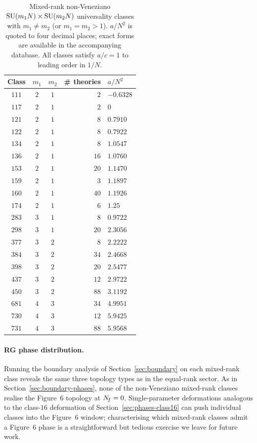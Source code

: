 \begin{table}[h]
  \centering
  \small
  \begin{tabular}{cccrl}
    \toprule
    Class & $m_{1}$ & $m_{2}$ & \# theories & $a/N^{2}$ \\
    \midrule
    $111$ & $2$ & $1$ & $2$  & $-0.6328$ \\
    $117$ & $2$ & $1$ & $2$  & $0$         \\
    $121$ & $2$ & $1$ & $8$  & $0.7910$ \\
    $122$ & $2$ & $1$ & $8$  & $0.7922$ \\
    $134$ & $2$ & $1$ & $8$  & $1.0547$ \\
    $136$ & $2$ & $1$ & $16$ & $1.0760$ \\
    $153$ & $2$ & $1$ & $20$ & $1.1470$ \\
    $159$ & $2$ & $1$ & $3$  & $1.1897$ \\
    $160$ & $2$ & $1$ & $40$ & $1.1926$ \\
    $174$ & $2$ & $1$ & $6$  & $1.25$    \\
    $283$ & $3$ & $1$ & $8$  & $0.9722$ \\
    $298$ & $3$ & $1$ & $20$ & $2.3056$ \\
    $377$ & $3$ & $2$ & $8$  & $2.2222$ \\
    $384$ & $3$ & $2$ & $34$ & $2.4668$ \\
    $398$ & $3$ & $2$ & $20$ & $2.5477$ \\
    $437$ & $3$ & $2$ & $12$ & $2.9722$ \\
    $450$ & $3$ & $2$ & $88$ & $3.1192$ \\
    $681$ & $4$ & $3$ & $34$ & $4.9951$ \\
    $730$ & $4$ & $3$ & $12$ & $5.9425$ \\
    $731$ & $4$ & $3$ & $88$ & $5.9568$ \\
    \bottomrule
  \end{tabular}
  \caption{Mixed-rank non-Veneziano $\mathrm{SU}(m_{1}N)\times\mathrm{SU}(m_{2}N)$
    universality classes with $m_{1}\ne m_{2}$ (or $m_{1}=m_{2}>1$).
    $a/N^{2}$ is quoted to four decimal places; exact forms are
    available in the accompanying database.  All classes satisfy
    $a/c=1$ to leading order in $1/N$.}
  \label{tab:mixed-rank-inventory}
\end{table}

\paragraph{RG phase distribution.}  Running the boundary analysis of
Section~\ref{sec:boundary} on each mixed-rank class reveals the same
three topology types as in the equal-rank sector.  As in
Section~\ref{sec:boundary-phases}, none of the non-Veneziano
mixed-rank classes realise the Figure~6 topology at $N_{\!f}=0$.
Single-parameter deformations analogous to the class-$16$ deformation
of Section~\ref{sec:phases-class16} can push individual classes into
the Figure~6 window; characterising which mixed-rank classes admit a
Figure~6 phase is a straightforward but tedious exercise we leave
for future work.


